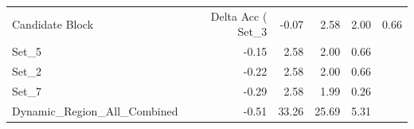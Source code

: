 \begin{tabular}{lrrrr}
\toprule
Candidate Block & Delta Acc (%
\midrule
Set_3 & -0.07 & 2.58 & 2.00 & 0.66 \\
Set_5 & -0.15 & 2.58 & 2.00 & 0.66 \\
Set_2 & -0.22 & 2.58 & 2.00 & 0.66 \\
Set_7 & -0.29 & 2.58 & 1.99 & 0.26 \\
Dynamic_Region_All_Combined & -0.51 & 33.26 & 25.69 & 5.31 \\
\bottomrule
\end{tabular}
